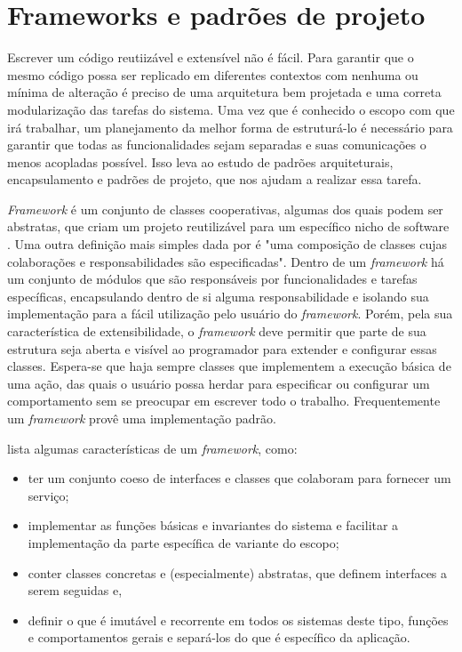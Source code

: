 \section{Frameworks e padrões de projeto}

Escrever um código reutiizável e extensível não é fácil. Para garantir que o mesmo código possa ser replicado em diferentes contextos com nenhuma ou mínima de alteração é preciso de uma arquitetura bem projetada e uma correta modularização das tarefas do sistema. Uma vez que é conhecido o escopo com que irá trabalhar, um planejamento da melhor forma de estruturá-lo é necessário para garantir que todas as funcionalidades sejam separadas e suas comunicações o menos acopladas possível. Isso leva ao estudo de padrões arquiteturais, encapsulamento e padrões de projeto, que nos ajudam a realizar essa tarefa.

\textit{Framework} é um conjunto de classes cooperativas, algumas dos quais podem ser abstratas, que criam um projeto reutilizável para um específico nicho de software \cite{Szyperski2002}. Uma outra definição mais simples dada por \cite{Fayad1999} é "uma composição de classes cujas colaborações e responsabilidades são especificadas". Dentro de um \textit{framework} há um conjunto de módulos que são responsáveis por funcionalidades e tarefas específicas, encapsulando dentro de si alguma responsabilidade e isolando sua implementação para a fácil utilização pelo usuário do \textit{framework}. Porém, pela sua característica de extensibilidade, o \textit{framework} deve permitir que parte de sua estrutura seja aberta e visível ao programador para extender e configurar essas classes. Espera-se que haja sempre classes que implementem a execução básica de uma ação, das quais o usuário possa herdar para especificar ou configurar um comportamento sem se preocupar em escrever todo o trabalho. Frequentemente um \textit{framework} provê uma implementação padrão.

\cite{Larman2005} lista algumas características de um \textit{framework}, como:
\begin{itemize}
  \item ter um conjunto coeso de interfaces e classes que colaboram para fornecer um serviço;
  \item implementar as funções básicas e invariantes do sistema e facilitar a implementação da parte específica de variante do escopo;
  \item conter classes concretas e (especialmente) abstratas, que definem interfaces a serem seguidas e,
  \item definir o que é imutável e recorrente em todos os sistemas deste tipo, funções e comportamentos gerais e separá-los do que é específico da aplicação.
\end{itemize} 

